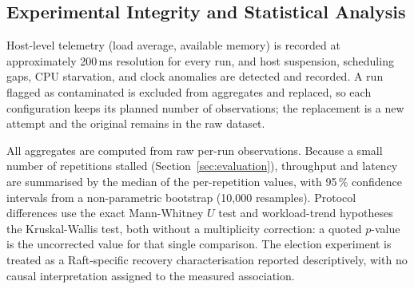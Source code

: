 \subsection{Experimental Integrity and Statistical Analysis}

Host-level telemetry (load average, available memory) is recorded at
approximately 200\,ms resolution for every run, and host suspension,
scheduling gaps, CPU starvation, and clock anomalies are detected and
recorded. A run flagged as contaminated is excluded from aggregates and
replaced, so each configuration keeps its planned number of observations;
the replacement is a new attempt and the original remains in the raw
dataset.

All aggregates are computed from raw per-run observations. Because a small
number of repetitions stalled (Section~\ref{sec:evaluation}), throughput
and latency are summarised by the median of the per-repetition values, with
95\,\% confidence intervals from a non-parametric bootstrap (10{,}000
resamples). Protocol differences use the exact Mann-Whitney $U$ test and
workload-trend hypotheses the Kruskal-Wallis test, both without a
multiplicity correction: a quoted $p$-value is the uncorrected value for
that single comparison. The election experiment is treated as a
Raft-specific recovery characterisation reported descriptively, with no
causal interpretation assigned to the measured association.
